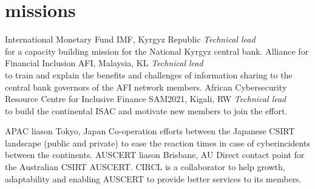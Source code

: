 \documentclass[a4paper]{friggeri-cv} %
\begin{document}

\section{missions}
\begin{entrylist}
{International Monetary Fund}
{IMF, Kyrgyz Republic}
{\emph{Technical lead} \\ for a capacity building mission for the National Kyrgyz central bank.}
{Alliance for Financial Inclusion}
{AFI, Malaysia, KL}
{\emph{Technical lead} \\ to train and explain the benefits and challenges of information sharing to the central bank governors of the AFI network members.}
{African Cybersecurity Resource Centre for Inclusive Finance}
{SAM2021, Kigali, RW}
{\emph{Technical lead} \\ to build the continental ISAC and motivate new members to join the effort.}

{APAC liason}
{Tokyo, Japan}
{Co-operation efforts between the Japanese CSIRT landscape (public and private) to ease the reaction times in case of cyberincidents between the continents.}
{AUSCERT liason}
{Brisbane, AU}
{Direct contact point for the Australian CSIRT AUSCERT. CIRCL is a collaborator to help growth, adaptability and enabling AUSCERT to provide better services to its members.}
\end{entrylist}

\newpage

\end{document}
